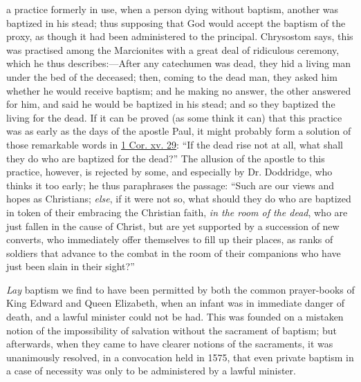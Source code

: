 	\begin{compactdesc}
		\item[86--87] a practice formerly in use, when a person dying without baptism, another was baptized in his stead; thus supposing that God would accept the baptism of the proxy, as though it had been administered to the principal. Chrysostom says, this was practised among the Marcionites with a great deal of ridiculous ceremony, which he thus describes:---After any catechumen was dead, they hid a living man under the bed of the deceased; then, coming to the dead man, they asked him whether he would receive baptism; and he making no answer, the other answered for him, and said he would be baptized in his stead; and so they baptized the living for the dead. If it can be proved (as some think it can) that this practice was as early as the days of the apostle Paul, it might probably form a solution of those remarkable words in \hyperref[1CORINTHIANS-15-29]{1 Cor. xv. 29}: ``If the dead rise not at all, what shall they do who are baptized for the dead?'' The allusion of the apostle to this practice, however, is rejected by some, and especially by Dr. Doddridge, who thinks it too early; he thus paraphrases the passage: ``Such are our views and hopes as Christians; \textit{else}, if it were not so, what should they do who are baptized in token of their embracing the Christian faith, \textit{in the room of the dead}, who are just fallen in the cause of Christ, but are yet supported by a succession of new converts, who immediately offer themselves to fill up their places, as ranks of soldiers that advance to the combat in the room of their companions who have just been slain in their sight?''
		
		\textit{Lay} baptism we find to have been permitted by both the common prayer-books of King Edward and Queen Elizabeth, when an infant was in immediate danger of death, and a lawful minister could not be had. This was founded on a mistaken notion of the impossibility of salvation without the sacrament of baptism; but afterwards, when they came to have clearer notions of the sacraments, it was unanimously resolved, in a convocation held in 1575, that even private baptism in a case of necessity was only to be administered by a lawful minister.
	\end{compactdesc}
	

